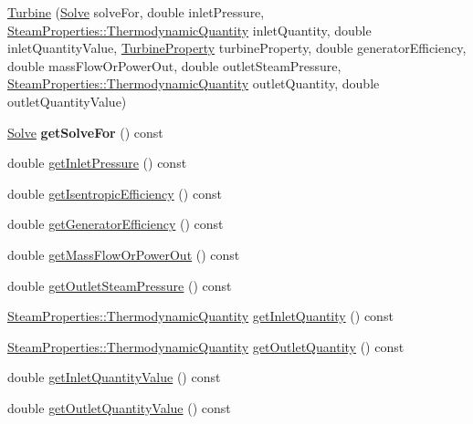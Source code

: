 \begin{DoxyCompactItemize}
\item 
\hyperlink{class_turbine_a1ec182906c075407882de542954d9030}{Turbine} (\hyperlink{class_turbine_a9fd7beba6c6f071e228fbe3e07969d2b}{Solve} solve\+For, double inlet\+Pressure, \hyperlink{class_steam_properties_ae0294bedf7d178c2d8fb6aed0f62fbff}{Steam\+Properties\+::\+Thermodynamic\+Quantity} inlet\+Quantity, double inlet\+Quantity\+Value, \hyperlink{class_turbine_a5db4f65cf2539e3837684d53221ade12}{Turbine\+Property} turbine\+Property, double generator\+Efficiency, double mass\+Flow\+Or\+Power\+Out, double outlet\+Steam\+Pressure, \hyperlink{class_steam_properties_ae0294bedf7d178c2d8fb6aed0f62fbff}{Steam\+Properties\+::\+Thermodynamic\+Quantity} outlet\+Quantity, double outlet\+Quantity\+Value)
\item 
\mbox{\label{class_turbine_a58c73057a4b890eab2af2b42c82484e6}} 
\hyperlink{class_turbine_a9fd7beba6c6f071e228fbe3e07969d2b}{Solve} {\bfseries get\+Solve\+For} () const
\item 
double \hyperlink{class_turbine_a148ad3877851f1c3931d8a6771d750c5}{get\+Inlet\+Pressure} () const
\item 
double \hyperlink{class_turbine_a5d907859de4acc153a32bd443238b445}{get\+Isentropic\+Efficiency} () const
\item 
double \hyperlink{class_turbine_a92266fd994310d1842ba37c05bc40bf8}{get\+Generator\+Efficiency} () const
\item 
double \hyperlink{class_turbine_a820a090d264b96ee84f717555545c287}{get\+Mass\+Flow\+Or\+Power\+Out} () const
\item 
double \hyperlink{class_turbine_a1589b2364a553db7aaa875bb543d171d}{get\+Outlet\+Steam\+Pressure} () const
\item 
\hyperlink{class_steam_properties_ae0294bedf7d178c2d8fb6aed0f62fbff}{Steam\+Properties\+::\+Thermodynamic\+Quantity} \hyperlink{class_turbine_ac9e91d9539cea5cd1e0037c397c28c78}{get\+Inlet\+Quantity} () const
\item 
\hyperlink{class_steam_properties_ae0294bedf7d178c2d8fb6aed0f62fbff}{Steam\+Properties\+::\+Thermodynamic\+Quantity} \hyperlink{class_turbine_acd3e98ab67754b652de97498d9bec6d2}{get\+Outlet\+Quantity} () const
\item 
double \hyperlink{class_turbine_a3d8a3f317fa71abb3404144371615725}{get\+Inlet\+Quantity\+Value} () const
\item 
double \hyperlink{class_turbine_aca98f128213e02e95dfd6f4b2ad8de4e}{get\+Outlet\+Quantity\+Value} () const
\item 

\end{DoxyCompactItemize}
